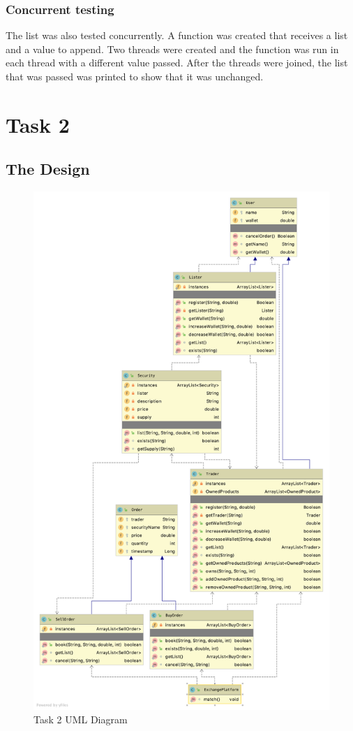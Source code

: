 \documentclass[a4paper, 12pt]{report}
\begin{document}
\subsubsection{Concurrent testing}
The list was also tested concurrently. A function was created that receives a list and a value to append. Two threads were created and the function was run in each thread with a different value passed. After the threads were joined, the list that was passed was printed to show that it was unchanged.

\section{Task 2}

\subsection{The Design}
\begin{figure}[H]
    \centering
    \includegraphics[width=\textwidth,height=\textheight,keepaspectratio]{"UML 2"}
    \caption{Task 2 UML Diagram}
\end{figure}
\end{document}
